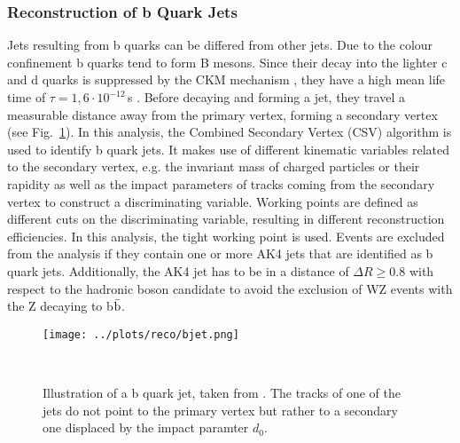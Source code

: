 \subsubsection*{Reconstruction of b Quark Jets}
Jets resulting from b quarks can be differed from other jets. Due to the colour confinement b quarks tend to form B mesons. Since their decay into the lighter c and d quarks is suppressed by the CKM mechanism \cite{CKM}, they have a high mean life time of $\tau=1,6\cdot 10^{-12}$\,s \cite{SMmasses}. Before decaying and forming a jet, they travel a measurable distance away from the primary vertex, forming a secondary vertex (see Fig.~\ref{fig:reco:bjet}). In this analysis, the Combined Secondary Vertex (CSV) algorithm \cite{CSV} is used to identify b quark jets. It makes use of different kinematic variables related to the secondary vertex, e.g. the invariant mass of charged particles or their rapidity as well as the impact parameters of tracks coming from the secondary vertex to construct a discriminating variable. Working points are defined as different cuts on the discriminating variable, resulting in different reconstruction efficiencies. In this analysis, the tight working point is used. Events are excluded from the analysis if they contain one or more AK4 jets that are identified as b quark jets. Additionally, the AK4 jet has to be in a distance of $\Delta R \geq 0.8$ with respect to the hadronic boson candidate to avoid the exclusion of WZ events with the Z decaying to b$\bar{\rm b}$.
\begin{figure}
    \centering
    \texttt{[image: ../plots/reco/bjet.png]}
    \caption[Illustration of a b quark jet]{Illustration of a b quark jet, taken from \cite{bjet}. The tracks of one of the jets do not point to the primary vertex but rather to a secondary one displaced by the impact paramter $d_0$.}\
    \label{fig:reco:bjet}
\end{figure}

